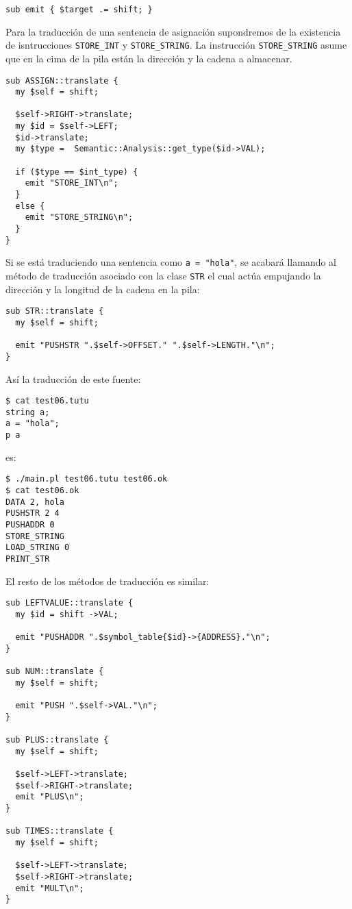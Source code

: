 \begin{verbatim}
sub emit { $target .= shift; }
\end{verbatim}

Para la traducción de una sentencia de asignación
supondremos de la existencia de isntrucciones \verb|STORE_INT|
y \verb|STORE_STRING|. La instrucción \verb|STORE_STRING| asume 
que en la cima de la pila están la dirección y la cadena a almacenar.

\begin{verbatim}
sub ASSIGN::translate {
  my $self = shift;

  $self->RIGHT->translate;
  my $id = $self->LEFT;
  $id->translate;
  my $type =  Semantic::Analysis::get_type($id->VAL);

  if ($type == $int_type) {
    emit "STORE_INT\n";
  }
  else {
    emit "STORE_STRING\n";
  }
}
\end{verbatim}
Si se está traduciendo una sentencia como \verb|a = "hola"|,
se acabará llamando al método 
de traducción asociado con la clase \verb|STR|
el cual actúa empujando la dirección y la longitud de la cadena en
la pila:
\begin{verbatim}
sub STR::translate {
  my $self = shift;

  emit "PUSHSTR ".$self->OFFSET." ".$self->LENGTH."\n";
}
\end{verbatim}
Así la traducción de este fuente:

\begin{verbatim}
$ cat test06.tutu
string a;
a = "hola";
p a
\end{verbatim}

es:

\begin{verbatim}
$ ./main.pl test06.tutu test06.ok
$ cat test06.ok
DATA 2, hola
PUSHSTR 2 4
PUSHADDR 0
STORE_STRING
LOAD_STRING 0
PRINT_STR
\end{verbatim}

El resto de los métodos de traducción es similar:
\begin{verbatim}
sub LEFTVALUE::translate {
  my $id = shift ->VAL;

  emit "PUSHADDR ".$symbol_table{$id}->{ADDRESS}."\n";
}

sub NUM::translate {
  my $self = shift;

  emit "PUSH ".$self->VAL."\n";
}

sub PLUS::translate {
  my $self = shift;

  $self->LEFT->translate;
  $self->RIGHT->translate;
  emit "PLUS\n";
}

sub TIMES::translate {
  my $self = shift;

  $self->LEFT->translate;
  $self->RIGHT->translate;
  emit "MULT\n";
}
\end{verbatim}

